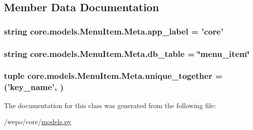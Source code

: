 \subsection{Member Data Documentation}
\hypertarget{classcore_1_1models_1_1MenuItem_1_1Meta_a139c557f4e05209ac70b495aece021b7}{
\subsubsection[{app\-\_\-label}]{\setlength{\rightskip}{0pt plus 5cm}string core.\-models.\-Menu\-Item.\-Meta.\-app\-\_\-label = 'core'\hspace{0.3cm}{\ttfamily [static]}}}\label{classcore_1_1models_1_1MenuItem_1_1Meta_a139c557f4e05209ac70b495aece021b7}
\hypertarget{classcore_1_1models_1_1MenuItem_1_1Meta_a200e7835b578293b589bfefa49a237c4}{
\subsubsection[{db\-\_\-table}]{\setlength{\rightskip}{0pt plus 5cm}string core.\-models.\-Menu\-Item.\-Meta.\-db\-\_\-table = \char`\"{}menu\-\_\-item\char`\"{}\hspace{0.3cm}{\ttfamily [static]}}}\label{classcore_1_1models_1_1MenuItem_1_1Meta_a200e7835b578293b589bfefa49a237c4}
\hypertarget{classcore_1_1models_1_1MenuItem_1_1Meta_ab18d0cc030946e61e3aaf5ef3d063322}{
\subsubsection[{unique\-\_\-together}]{\setlength{\rightskip}{0pt plus 5cm}tuple core.\-models.\-Menu\-Item.\-Meta.\-unique\-\_\-together = ('{\bf key\-\_\-name}', )\hspace{0.3cm}{\ttfamily [static]}}}\label{classcore_1_1models_1_1MenuItem_1_1Meta_ab18d0cc030946e61e3aaf5ef3d063322}


The documentation for this class was generated from the following file\-:\begin{DoxyCompactItemize}
\item 
/wepo/core/\hyperlink{models_8py}{models.\-py}\end{DoxyCompactItemize}
